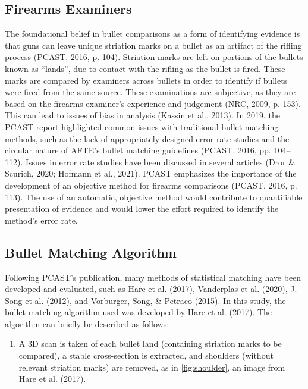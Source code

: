 \documentclass[print]{nuthesis}
\providecommand{\tightlist}{%
  \setlength{\itemsep}{0pt}\setlength{\parskip}{0pt}}
\begin{document}
\hypertarget{firearms-examiners}{%
\subsection{Firearms Examiners}\label{firearms-examiners}}

The foundational belief in bullet comparisons as a form of identifying evidence is that guns can leave unique striation marks on a bullet as an artifact of the rifling process (PCAST, 2016, p. 104).
Striation marks are left on portions of the bullets known as ``lands'', due to contact with the rifling as the bullet is fired.
These marks are compared by examiners across bullets in order to identify if bullets were fired from the same source.
These examinations are subjective, as they are based on the firearms examiner's experience and judgement (NRC, 2009, p. 153).
This can lead to issues of bias in analysis (Kassin et al., 2013). In 2019, the PCAST report highlighted common issues with traditional bullet matching methods, such as the lack of appropriately designed error rate studies and the circular nature of AFTE's bullet matching guidelines (PCAST, 2016, pp. 104--112).
Issues in error rate studies have been discussed in several articles (Dror \& Scurich, 2020; Hofmann et al., 2021).
PCAST emphasizes the importance of the development of an objective method for firearms comparisons (PCAST, 2016, p. 113).
The use of an automatic, objective method would contribute to quantifiable presentation of evidence and would lower the effort required to identify the method's error rate.

\hypertarget{bullet-matching-algorithm-1}{%
\subsection{Bullet Matching Algorithm}\label{bullet-matching-algorithm-1}}

Following PCAST's publication, many methods of statistical matching have been developed and evaluated, such as Hare et al. (2017), Vanderplas et al. (2020), J. Song et al. (2012), and Vorburger, Song, \& Petraco (2015).
In this study, the bullet matching algorithm used was developed by Hare et al. (2017).
The algorithm can briefly be described as follows:

\begin{enumerate}
\def\labelenumi{\arabic{enumi}.}
\tightlist
\item
  A 3D scan is taken of each bullet land (containing striation marks to be compared), a stable cross-section is extracted, and shoulders (without relevant striation marks) are removed, as in \ref{fig:shoulder}, an image from Hare et al. (2017).
\end{enumerate}
\end{document}
